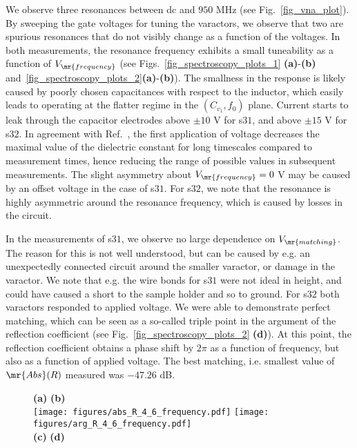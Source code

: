 \documentclass[10pt,a4paper,twoside]{article}
\begin{document}
\begin{multicols}{2}
We observe three resonances between dc and $950$ MHz (see Fig.~\ref{fig_vna_plot}). By sweeping the gate voltages for tuning the varactors, we observe that two are spurious resonances that do not visibly change as a function of the voltages. In both measurements, the resonance frequency exhibits a small tuneability as a function of $V_{\mr{frequency}}$ (see Figs.~\ref{fig_spectroscopy_plots_1} \textbf{(a)}-\textbf{(b)} and~\ref{fig_spectroscopy_plots_2}\textbf{(a)}-\textbf{(b)}). The smallness in the response is likely caused by poorly chosen capacitances with respect to the inductor, which easily leads to operating at the flatter regime in the $(C_{v_1},f_0)$ plane. Current starts to leak through the capacitor electrodes above $\pm 10$ V for s$31$, and above $\pm 15$ V for s$32$. In agreement with Ref.~\cite{davidovikj2017quantum}, the first application of voltage decreases the maximal value of the dielectric constant for long timescales compared to measurement times, hence reducing the range of possible values in subsequent measurements. The slight asymmetry about $V_{\mr{frequency}} = 0$ V may be caused by an offset voltage in the case of s$31$. For s$32$, we note that the resonance is highly asymmetric around the resonance frequency, which is caused by losses in the circuit. 
\par
In the measurements of s$31$, we observe no large dependence on $V_{\mr{matching}}$. The reason for this is not well understood, but can be caused by e.g. an unexpectedly connected circuit around the smaller varactor, or damage in the varactor. We note that e.g. the wire bonds for s$31$ were not ideal in height, and could have caused a short to the sample holder and so to ground. For s$32$ both varactors responded to applied voltage. We were able to demonstrate perfect matching, which can be seen as a so-called triple point in the argument of the reflection coefficient (see Fig.~\ref{fig_spectroscopy_plots_2} \textbf{(d)}). At this point, the reflection coefficient obtains a phase shift by $2\pi$ as a function of frequency, but also as a function of applied voltage. The best matching, i.e. smallest value of $\mr{Abs}(R)$ measured was $-47.26$ dB. 
\begin{figure*}[t]
  \centering
  \textbf{(a)} \hspace{10em} \textbf{(b)}
  \\
  \texttt{[image: figures/abs\_R\_4\_6\_frequency.pdf]}
  \texttt{[image: figures/arg\_R\_4\_6\_frequency.pdf]}
  \\
  \vspace{-1em}\textbf{(c)} \hspace{10em} \textbf{(d)} 

\end{figure*}
\end{multicols}
\end{document}
